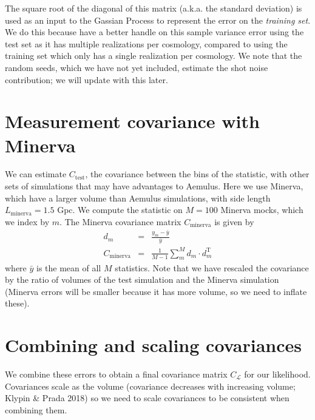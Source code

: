 \documentclass[12pt]{article}
\newcommand{\T}{^{\mathrm{T}}}
\newcommand{\like}{\mathcal{L}}
\newcommand{\cov}[1]{C_\text{#1}}
\newcommand{\covtot}{C_\like}
\begin{document}
The square root of the diagonal of this matrix (a.k.a. the standard deviation) is used as an input to the Gassian Process to represent the error on the \emph{training set}. %
We do this because have a better handle on this sample variance error using the test set as it has multiple realizations per cosmology, compared to using the training set which only has a single realization per cosmology.
We note that the random seeds, which we have not yet included, estimate the shot noise contribution; we will update with this later.


\section{Measurement covariance with Minerva}

We can estimate $\cov{test}$, the covariance between the bins of the statistic, with other sets of simulations that may have advantages to Aemulus.
Here we use Minerva, which have a larger volume than Aemulus simulations, with side length $L_\text{minerva}=1.5$ Gpc.
We compute the statistic on $M=100$ Minerva mocks, which we index by $m$.
The Minerva covariance matrix $\cov{minerva}$ is given by
\begin{eqnarray}
d_m &=& \frac{y_{m} - \bar{y}}{\bar{y}} \\
\cov{minerva} &=& \frac{1}{M-1} \sum_m^M d_m \cdot d_m\T
\end{eqnarray}
where $\bar{y}$ is the mean of all $M$ statistics.
Note that we have rescaled the covariance by the ratio of volumes of the test simulation and the Minerva simulation (Minerva errors will be smaller because it has more volume, so we need to inflate these).


\section{Combining and scaling covariances}

We combine these errors to obtain a final covariance matrix $\covtot$ for our likelihood.
Covariances scale as the volume (covariance decreases with increasing volume; Klypin \& Prada 2018) so we need to scale covariances to be consistent when combining them.
\end{document}

